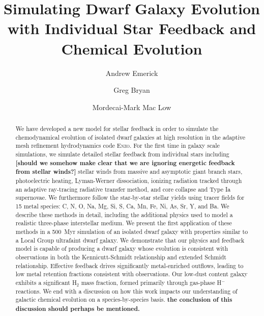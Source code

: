 \documentclass[twocolumn]{aastex61}
\begin{document}
\title{Simulating Dwarf Galaxy Evolution with Individual Star Feedback and Chemical Evolution}
\author{Andrew Emerick}
\author{Greg Bryan}
\author{Mordecai-Mark Mac Low}


\begin{abstract}
We have developed a new model for stellar feedback in order to simulate the chemodynamical evolution of isolated dwarf galaxies at high resolution in the adaptive mesh refinement hydrodynamics code \textsc{Enzo}. For the first time in galaxy scale simulations, we simulate detailed stellar feedback from individual stars including 
     {\bf [should we somehow make clear that we are ignoring energetic feedback from stellar winds?]}
stellar winds from massive and asymptotic giant branch stars, photoelectric heating, Lyman-Werner dissociation, ionizing radiation tracked through an adaptive ray-tracing radiative transfer method, and core collapse and Type Ia supernovae. 
We furthermore follow the star-by-star stellar yields using tracer fields for 15 metal species: C, N, O, Na, Mg, Si, S, Ca, Mn, Fe, Ni, As, Sr, Y, and Ba. We describe these methods in detail, including the additional physics used to model a realistic three-phase interstellar medium. We present the first application of these methods in a 500~Myr simulation of an isolated dwarf galaxy with properties similar to a Local Group ultrafaint dwarf galaxy. We demonstrate that our physics and feedback model is capable of producing a dwarf galaxy whose evolution is consistent with observations in both the Kennicutt-Schmidt relationship and extended Schmidt relationship. Effective feedback drives significantly metal-enriched outflows, leading to low metal retention fractions consistent with observations. Our low-dust content galaxy exhibits a significant H$_2$ mass fraction, formed primarily through gas-phase H$^{-}$ reactions. We end with a discussion on how this work impacts our understanding of galactic chemical evolution on a species-by-species basis. {\bf the conclusion of this discussion should perhaps be mentioned.}
\end{abstract}
\end{document}
